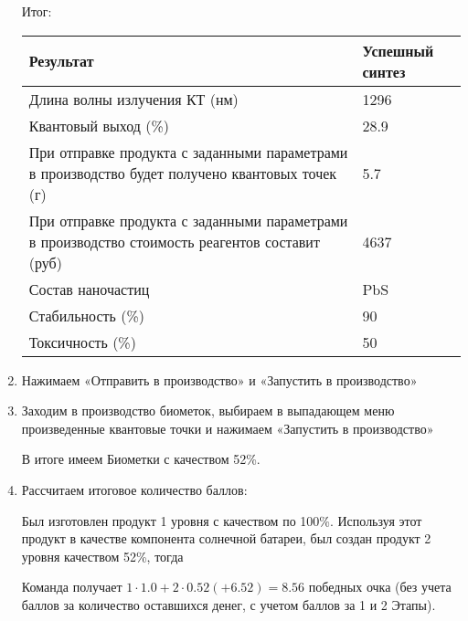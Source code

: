 \begin{enumerate}
Итог:

    \begin{longtable}{|p{9cm}|p{4cm}|}
        \hline
        Результат	&Успешный синтез \\
        \hline
        Длина волны излучения КТ (нм)&	1296 \\
        \hline
        Квантовый выход (\%)&	28.9 \\
        \hline
        При отправке продукта с заданными параметрами в производство будет получено квантовых точек (г)&	5.7 \\
        \hline
        При отправке продукта с заданными параметрами в производство стоимость реагентов составит (руб)&	4637 \\
        \hline
        Состав наночастиц&	PbS \\
        \hline
        Стабильность (\%)&	90 \\
        \hline
        Токсичность (\%)&	50 \\
        \hline
    \end{longtable}

    \item Нажимаем «Отправить в производство» и «Запустить в производство»
    \item Заходим в производство биометок, выбираем в выпадающем меню произведенные квантовые точки и нажимаем «Запустить в производство»
    
    В итоге имеем Биометки с качеством 52\%.
    \item Рассчитаем итоговое количество баллов:
    
    Был изготовлен продукт 1 уровня с качеством по 100\%. Используя этот продукт в качестве компонента солнечной батареи, был создан продукт 2 уровня качеством 52\%, тогда

    Команда получает $1 \cdot 1.0 + 2 \cdot 0.52 (+6.52) = 8.56$ победных очка (без учета баллов за количество оставшихся денег, с учетом баллов за 1 и 2 Этапы).
\end{enumerate}